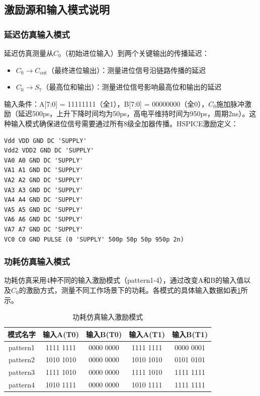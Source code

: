 \documentclass[UTF8,12pt,a4paper]{ctexart}
\begin{document}
\subsection{激励源和输入模式说明}

\subsubsection{延迟仿真输入模式}

延迟仿真测量从$C_0$（初始进位输入）到两个关键输出的传播延迟：
\begin{itemize}
    \item $C_0 \rightarrow C_{\text{out}}$（最终进位输出）：测量进位信号沿链路传播的延迟
    \item $C_0 \rightarrow S_7$（最高位和输出）：测量进位信号影响最高位和输出的延迟
\end{itemize}

输入条件：A[7:0] = 11111111（全1），B[7:0] = 00000000（全0），$C_0$施加脉冲激励（延迟500ps，上升下降时间均为50ps，高电平维持时间为950ps，周期2ns）。这种输入模式确保进位信号需要通过所有8级全加器传播。HSPICE激励定义：
\begin{lstlisting}
Vdd VDD GND DC 'SUPPLY'
Vdd2 VDD2 GND DC 'SUPPLY'
VA0 A0 GND DC 'SUPPLY'
VA1 A1 GND DC 'SUPPLY'
VA2 A2 GND DC 'SUPPLY'
VA3 A3 GND DC 'SUPPLY'
VA4 A4 GND DC 'SUPPLY'
VA5 A5 GND DC 'SUPPLY'
VA6 A6 GND DC 'SUPPLY'
VA7 A7 GND DC 'SUPPLY'
VC0 C0 GND PULSE (0 'SUPPLY' 500p 50p 50p 950p 2n)
\end{lstlisting}

\subsubsection{功耗仿真输入模式}

功耗仿真采用4种不同的输入激励模式（pattern1-4），通过改变A和B的输入值以及$C_0$的激励方式，测量不同工作场景下的功耗。各模式的具体输入数据如表\ref{tab:task2_power_pattern}所示。

\begin{table}[htbp]
\centering
\caption{功耗仿真输入激励模式}
\label{tab:task2_power_pattern}
\begin{tabular}{ccccc}
\toprule
\textbf{模式名字} & \textbf{输入A(T0)} & \textbf{输入B(T0)} & \textbf{输入A(T1)} & \textbf{输入B(T1)} \\
\midrule
pattern1 & 1111 1111 & 0000 0000 & 1111 1111 & 0000 0001 \\
pattern2 & 1010 1010 & 0000 0000 & 1010 1010 & 0101 0101 \\
pattern3 & 1111 1010 & 0000 0000 & 1111 1010 & 1111 1111 \\
pattern4 & 1010 1111 & 0000 0000 & 1010 1111 & 1111 1111 \\
\bottomrule
\end{tabular}
\end{table}
\end{document}
